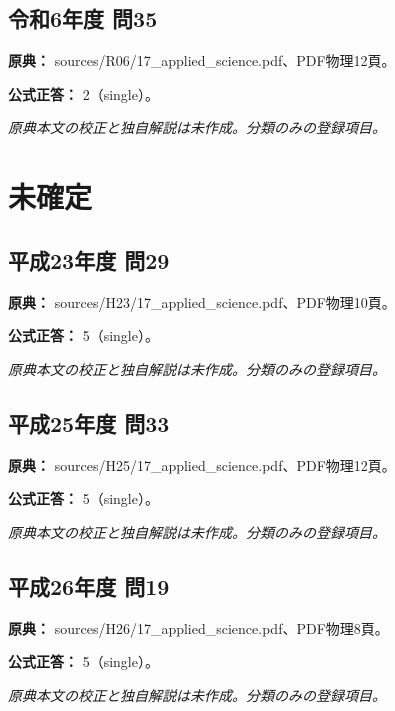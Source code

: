 \subsection{令和6年度 問35}
\label{q:r06-reg-applied-35}

\noindent\textbf{原典：} sources/R06/17\_applied\_science.pdf、PDF物理12頁。

\textbf{公式正答：} 2（single）。

\par\textit{原典本文の校正と独自解説は未作成。分類のみの登録項目。}

\section{未確定}

\subsection{平成23年度 問29}
\label{q:h23-reg-applied-29}

\noindent\textbf{原典：} sources/H23/17\_applied\_science.pdf、PDF物理10頁。

\textbf{公式正答：} 5（single）。

\par\textit{原典本文の校正と独自解説は未作成。分類のみの登録項目。}

\subsection{平成25年度 問33}
\label{q:h25-reg-applied-33}

\noindent\textbf{原典：} sources/H25/17\_applied\_science.pdf、PDF物理12頁。

\textbf{公式正答：} 5（single）。

\par\textit{原典本文の校正と独自解説は未作成。分類のみの登録項目。}

\subsection{平成26年度 問19}
\label{q:h26-reg-applied-19}

\noindent\textbf{原典：} sources/H26/17\_applied\_science.pdf、PDF物理8頁。

\textbf{公式正答：} 5（single）。

\par\textit{原典本文の校正と独自解説は未作成。分類のみの登録項目。}

